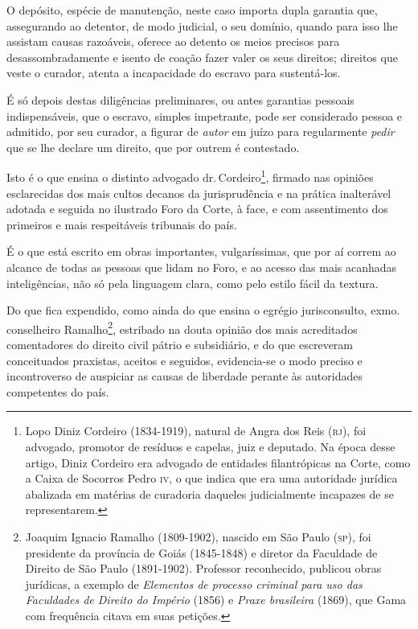 O depósito, espécie de manutenção, neste caso importa dupla garantia
que, assegurando ao detentor, de modo judicial, o seu domínio, quando
para isso lhe assistam causas razoáveis, oferece ao detento os meios
precisos para desassombradamente e isento de coação fazer valer os seus
direitos; direitos que veste o curador, atenta a incapacidade do escravo
para sustentá-los.

É só depois destas diligências preliminares, ou antes garantias pessoais
indispensáveis, que o escravo, simples impetrante, pode ser considerado
pessoa e admitido, por seu curador, a figurar de \emph{autor} em juízo
para regularmente \emph{pedir} que se lhe declare um direito, que por
outrem é contestado.

Isto é o que ensina o distinto advogado dr.\,Cordeiro\footnote{Lopo
  Diniz Cordeiro (1834-1919), natural de Angra dos Reis (\textsc{rj}), foi
  advogado, promotor de resíduos e capelas, juiz e deputado. Na época
  desse artigo, Diniz Cordeiro era advogado de entidades filantrópicas
  na Corte, como a Caixa de Socorros Pedro \textsc{iv}, o que indica que era uma
  autoridade jurídica abalizada em matérias de curadoria daqueles
  judicialmente incapazes de se representarem.}, firmado nas opiniões
esclarecidas dos mais cultos decanos da jurisprudência e na prática
inalterável adotada e seguida no ilustrado Foro da Corte, à face, e com
assentimento dos primeiros e mais respeitáveis tribunais do país.

É o que está escrito em obras importantes, vulgaríssimas, que por aí
correm ao alcance de todas as pessoas que lidam no Foro, e ao acesso das
mais acanhadas inteligências, não só pela linguagem clara, como pelo
estilo fácil da textura.

Do que fica expendido, como ainda do que ensina o egrégio jurisconsulto,
exmo.\,conselheiro Ramalho\footnote{Joaquim Ignacio Ramalho
  (1809-1902), nascido em São Paulo (\textsc{sp}), foi presidente da província de
  Goiás (1845-1848) e diretor da Faculdade de Direito de São Paulo
  (1891-1902). Professor reconhecido, publicou obras jurídicas, a
  exemplo de \emph{Elementos de processo criminal para uso das
  Faculdades de Direito do Império} (1856) e \emph{Praxe brasileira}
  (1869), que Gama com frequência citava em suas petições.}, estribado
na douta opinião dos mais acreditados comentadores do direito civil
pátrio e subsidiário, e do que escreveram conceituados praxistas,
aceitos e seguidos, evidencia-se o modo preciso e incontroverso de
auspiciar as causas de liberdade perante às autoridades competentes do
país.

